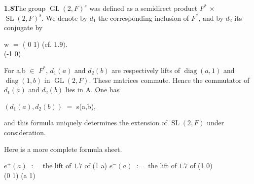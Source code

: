 \documentclass[10pt,a4paper]{article}
\begin{document}
\par\noindent\textbf{1.8}\quad The group $\operatorname{GL}(2,F)^s$ was defined as a semidirect product $F^*$ $\times{}$ $\operatorname{SL}(2,F)^s$. We denote by $d_1$ the corresponding inclusion of $F^*$, and by $d_2$ its conjugate by\par
\par\smallskip\begin{center}\begin{minipage}{0.96\textwidth}\centering
w $=$ ( 0 1) (cf. $1.9)$. \\ (-1 0)
\end{minipage}\end{center}\smallskip
\par For a,b $\in{}$ $F^*$, $d_1(a)$ and $d_2(b)$ are respectively lifts of $\operatorname{diag}(a,1)$ and $\operatorname{diag}(1,b)$ in $\operatorname{GL}(2,F)$. These matrices commute. Hence the commutator of $d_1(a)$ and $d_2(b)$ lies in A. One has\par
\par\smallskip\begin{center}\begin{minipage}{0.96\textwidth}\centering
$(d_1(a),d_2(b))$ $=$ s(a,b),
\end{minipage}\end{center}\smallskip
\par and this formula uniquely determines the extension of $\operatorname{SL}(2,F)$ under consideration.\par
\par Here is a more complete formula sheet.\par
\par\medskip{}\par\smallskip
\par\smallskip\begin{center}\begin{minipage}{0.96\textwidth}\centering
$e^+(a)$ $:=$ the lift of $1.7$ of (1 a) $e^-(a)$ $:=$ the lift of $1.7$ of (1 0) \\ (0 1) (a 1)
\end{minipage}\end{center}\smallskip
\end{document}
